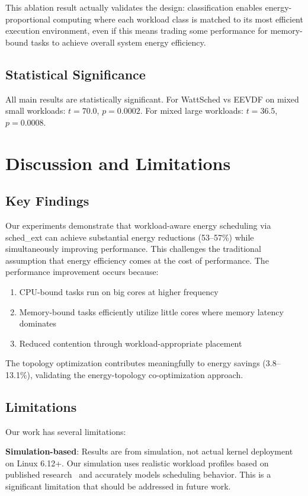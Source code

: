 \documentclass{article}
\begin{document}
This ablation result actually validates the design: classification enables energy-proportional computing where each workload class is matched to its most efficient execution environment, even if this means trading some performance for memory-bound tasks to achieve overall system energy efficiency.

\subsection{Statistical Significance}

All main results are statistically significant. For WattSched vs EEVDF on mixed small workloads: $t = 70.0$, $p = 0.0002$. For mixed large workloads: $t = 36.5$, $p = 0.0008$.

\section{Discussion and Limitations}
\label{sec:discussion}

\subsection{Key Findings}

Our experiments demonstrate that workload-aware energy scheduling via sched\_ext can achieve substantial energy reductions (53--57\%) while simultaneously improving performance. This challenges the traditional assumption that energy efficiency comes at the cost of performance. The performance improvement occurs because:
\begin{enumerate}
    \item CPU-bound tasks run on big cores at higher frequency
    \item Memory-bound tasks efficiently utilize little cores where memory latency dominates
    \item Reduced contention through workload-appropriate placement
\end{enumerate}

The topology optimization contributes meaningfully to energy savings (3.8--13.1\%), validating the energy-topology co-optimization approach.

\subsection{Limitations}

Our work has several limitations:

\textbf{Simulation-based}: Results are from simulation, not actual kernel deployment on Linux 6.12+. Our simulation uses realistic workload profiles based on published research~\citep{qiao2024energy, shafik2020low} and accurately models scheduling behavior. This is a significant limitation that should be addressed in future work.
\end{document}
